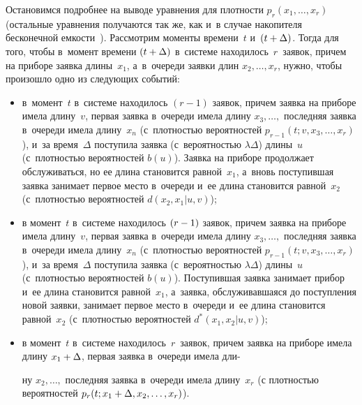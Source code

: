 \begin{multicols}{2}
Остановимся подробнее на выводе уравнения
для плотности $p_{r}(x_1,\ldots,x_{r})$ (остальные уравнения
получаются так же, как и~в случае накопителя бесконечной емкости~\cite{n1}).
Рассмотрим моменты времени~$t$ и~$(t\hm+\Delta)$.
Тогда для того, чтобы в~момент времени
$(t\hm+\Delta)$ в~системе находилось~$r$~заявок, причем
на приборе заявка длины~$x_1$, а~в~очереди
заявки длин $x_2,\ldots,x_r$, нужно, чтобы произошло одно из следующих событий:
\begin{itemize}
\item в~момент~$t$ в~системе находилось $(r-1)$
заявок, причем заявка на приборе имела
длину~$v$, первая заявка в~очереди имела
длину $x_3,\ldots,$ последняя заявка в~очереди
имела\linebreak
 длину~$x_n$ (с~плотностью вероятностей $p_{r-1}(t;v,x_3,\ldots,x_r)$),
и~за время~$\Delta$ поступила заявка (с~вероятностью $\lambda\Delta$) длины~$u$
(с~плотностью вероятностей $b(u)$).
Заявка на приборе продолжает обслуживаться,
но ее длина становится равной~$x_1$, а~вновь
поступившая заявка занимает первое мес\-то в~очереди и~ее длина становится равной~$x_2$
(с~плот\-ностью вероятностей $d(x_2,x_1|u,v)$);
\item
в момент~$t$ в~системе находилось $(r\hm-1)$
заявок, причем заявка на приборе имела
длину~$v$, первая заявка в~очереди имела
длину $x_3,\ldots,$ последняя заявка в~очереди имела\linebreak
 длину~$x_n$ (с~плот\-ностью
вероятностей $p_{r-1}(t;v,x_3,\ldots,x_r)$),
и~за время~$\Delta$ поступила заявка (с~вероятностью $\lambda\Delta$) длины~$u$
(с~плот\-ностью вероятностей $b(u)$).
Поступившая заявка занимает прибор и~ее длина
становится равной~$x_1$, а~заявка,
обслуживавшаяся до поступления новой заявки,
занимает первое мес\-то в~очереди и~ее длина
становится равной~$x_2$ (с~плотностью вероятностей $d^*(x_1,x_2|u,v)$);
\item
в момент~$t$ в~системе находилось~$r$~заявок,
причем заявка на приборе имела длину $x_1\hm+\Delta$, первая заявка в~очереди
имела дли-\linebreak\vspace*{-12pt}

\pagebreak

\noindent
ну $x_2,\ldots,$ последняя заявка в~очереди имела длину~$x_r$ (с плотностью
вероятностей $p_r(t;x_1\hm+\Delta,x_2,\ldots,x_r)$).
\end{itemize}



\end{multicols}

